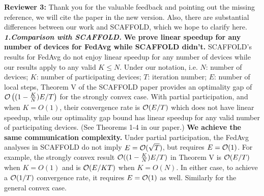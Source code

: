 \documentclass{article}
\begin{document}
{\color{blue}\textbf{Reviewer 3:}} Thank you for the valuable feedback and pointing out the missing reference, we will cite the paper in the new version. Also, there are substantial differences between our work and SCAFFOLD, which we hope to clarify here.
\\
\textbf{\textit{1.Comparison with SCAFFOLD.}}
	\textbf{We prove linear speedup for any number of devices for FedAvg while SCAFFOLD didn't.} SCAFFOLD's results for FedAvg do not enjoy linear speedup for any number of devices while our results apply to any valid $K\leq N$. Under our notation, i.e. $N$: number of devices; $K$: number of participating devices; $T$: iteration number; $E$: number of local steps, Theorem V of the SCAFFOLD paper provides an optimality gap of {\small ${\mathcal{O}}\left((1-\frac{K}{N})E/T\right)$} for the strongly convex case.
With partial participation, and when $K=O(1)$, their convergence rate is ${\mathcal{O}}(E/T)$ which does not have linear speedup, while our optimality gap bound has linear speedup for any valid number of participating devices. (See Theorems 1-4 in our paper.) 
	\textbf{We achieve the same communication complexity.}
	Under partial participation, the FedAvg analyses in SCAFFOLD do not imply $E={\mathcal{O}}(\sqrt{T})$, but requires $E={\mathcal{O}}(1)$. For example, the strongly convex result {\small ${\mathcal{O}}((1-\frac{K}{N})E/T)$} in Theorem V is ${\mathcal{O}}(E/T)$ when $K=O(1)$ and is ${\mathcal{O}}(E/KT)$ when $K=O(N)$.
	In either case, to achieve a ${\mathcal{O}}(1/T)$ convergence rate, it requires $E={\mathcal{O}}(1)$ as well. Similarly for the general convex case. 
\end{document}

